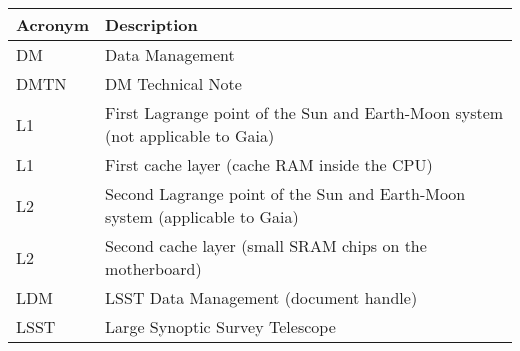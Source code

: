 \addtocounter{table}{-1}
\begin{longtable}{|l|p{}|}\hline
\textbf{Acronym} & \textbf{Description}  \\\hline

DM & Data Management \\\hline
DMTN & DM Technical Note \\\hline
L1 & First Lagrange point of the Sun and Earth-Moon system (not applicable to Gaia) \\\hline
L1 & First cache layer (cache RAM inside the CPU) \\\hline
L2 & Second Lagrange point of the Sun and Earth-Moon system (applicable to Gaia) \\\hline
L2 & Second cache layer (small SRAM chips on the motherboard) \\\hline
LDM & LSST Data Management (document handle) \\\hline
LSST & Large Synoptic Survey Telescope \\\hline
\end{longtable}
